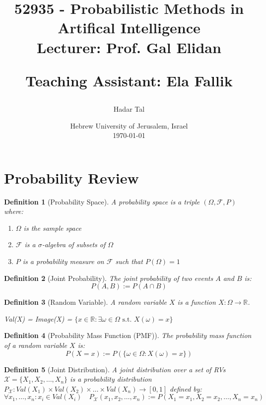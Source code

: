 \documentclass[11pt]{article}
\title{
    \huge 52935 - Probabilistic Methods in Artifical Intelligence\\
    \vspace{10pt}
    \Large Lecturer: Prof. Gal Elidan 
    
    Teaching Assistant: Ela Fallik

}
\author{Hadar Tal}
\date{Hebrew University of Jerusalem, Israel\\
    \vspace{10pt}
    \today}
\numberwithin{equation}{section}
\theoremstyle{boldStyle}
\theoremstyle{boldBlueStyle}
\theoremstyle{boldPurpleStyle}
\theoremstyle{boldRedStyle}
\newtheorem{definition}{Definition}[section]
\begin{document}
\maketitle
\tableofcontents

\newpage
\section{Probability Review}

\begin{definition}[Probability Space]
    A probability space is a triple $(\Omega, \mathcal{F}, P)$ where:
    \begin{enumerate}
        \item $\Omega$ is the sample space
        \item $\mathcal{F}$ is a $\sigma$-algebra of subsets of $\Omega$
        \item $P$ is a probability measure on $\mathcal{F}$ such that $P(\Omega) = 1$
    \end{enumerate}
\end{definition}

\begin{definition}[Joint Probability]
    The joint probability of two events $A$ and $B$ is:
    \begin{equation*}
        P(A, B) := P(A \cap B) 
    \end{equation*}
\end{definition}

\begin{definition}[Random Variable]
    A random variable $X$ is a function $X: \Omega \rightarrow \mathbb{R}$. 

    Val(X) = Image(X) = $\{ x \in \mathbb{R} : \exists \omega \in \Omega \text{ s.t. } X(\omega) = x \}$
\end{definition}

\begin{definition}[Probability Mass Function (PMF)]
    The probability mass function of a random variable $X$ is:
    \begin{equation*}
        P(X = x) := P(\{ \omega \in \Omega : X(\omega) = x \})
    \end{equation*}
\end{definition}

\begin{definition}[Joint Distribution]
    A joint distribution over a set of RVs $\mathcal{X} = \{ X_1, X_2, \ldots, X_n \}$ is a probability distribution 
    $P_{\mathcal{X}}: Val(X_1) \times Val(X_2) \times \ldots \times Val(X_n) \rightarrow [0, 1]$ defined by:
    \begin{equation*}
       \forall x_1, \ldots, x_n : x_i \in Val(X_i) \quad
        P_{\mathcal{X}}(x_1, x_2, \ldots, x_n) := P(X_1 = x_1, X_2 = x_2, \ldots, X_n = x_n)
    \end{equation*}
\end{definition}
\end{document}
